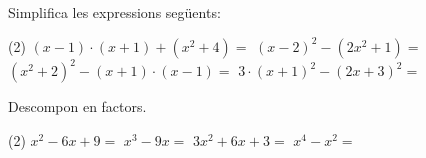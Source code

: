 \begin{mylist}
\exer  Simplifica les expressions següents:
\begin{tasks}(2)
	\task  $\left(x-1\right)\cdot \left(x+1\right)+\left(x^{2} +4\right)=$  	      
	\task  $\left(x-2\right)^{2} -\left(2x^{2} +1\right)=$	
	\task  $\left(x^{2} +2\right)^{2} -\left(x+1\right)\cdot \left(x-1\right)=$   	    
	\task  $3\cdot \left(x+1\right)^{2} -\left(2x+3\right)^{2} =$
\end{tasks}
\answers[cols=2]{[$2x^2+3$, $-x^2-4x+3$, $x^4+3x^2+5$, $-x^2-6x-6$]}

\exer  Descompon en factors.
\begin{tasks}(2)
	\task $x^{2} -6x+9=$                                                             
	\task   $x^{3} -9x=$	
	\task  $3x^{2} +6x+3=$                                                              
	\task  $x^{4} -x^{2} =$
\end{tasks}
\answers[cols=2]{[$(x-3)^2$, $x(x+3)(x-3)$, $3(x+1)^2$, $x^2(x+1)(x-1)$]}

 \end{mylist}
 

 

 

